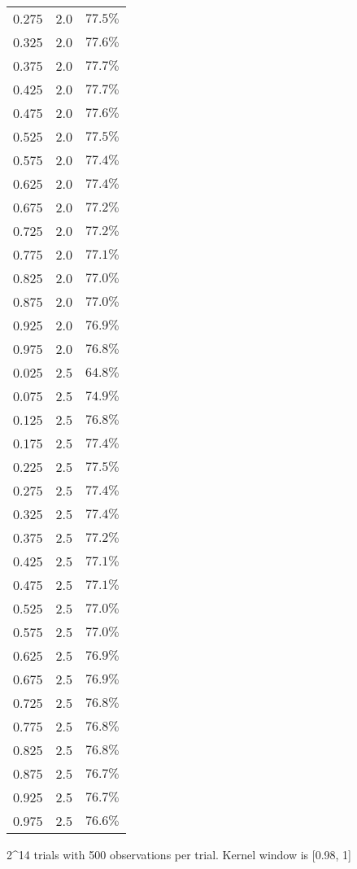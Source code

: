 \begin{longtable}{rrr}
0.275 & 2.0 & $77.5\%$ \\ 
0.325 & 2.0 & $77.6\%$ \\ 
0.375 & 2.0 & $77.7\%$ \\ 
0.425 & 2.0 & $77.7\%$ \\ 
0.475 & 2.0 & $77.6\%$ \\ 
0.525 & 2.0 & $77.5\%$ \\ 
0.575 & 2.0 & $77.4\%$ \\ 
0.625 & 2.0 & $77.4\%$ \\ 
0.675 & 2.0 & $77.2\%$ \\ 
0.725 & 2.0 & $77.2\%$ \\ 
0.775 & 2.0 & $77.1\%$ \\ 
0.825 & 2.0 & $77.0\%$ \\ 
0.875 & 2.0 & $77.0\%$ \\ 
0.925 & 2.0 & $76.9\%$ \\ 
0.975 & 2.0 & $76.8\%$ \\ 
0.025 & 2.5 & $64.8\%$ \\ 
0.075 & 2.5 & $74.9\%$ \\ 
0.125 & 2.5 & $76.8\%$ \\ 
0.175 & 2.5 & $77.4\%$ \\ 
0.225 & 2.5 & $77.5\%$ \\ 
0.275 & 2.5 & $77.4\%$ \\ 
0.325 & 2.5 & $77.4\%$ \\ 
0.375 & 2.5 & $77.2\%$ \\ 
0.425 & 2.5 & $77.1\%$ \\ 
0.475 & 2.5 & $77.1\%$ \\ 
0.525 & 2.5 & $77.0\%$ \\ 
0.575 & 2.5 & $77.0\%$ \\ 
0.625 & 2.5 & $76.9\%$ \\ 
0.675 & 2.5 & $76.9\%$ \\ 
0.725 & 2.5 & $76.8\%$ \\ 
0.775 & 2.5 & $76.8\%$ \\ 
0.825 & 2.5 & $76.8\%$ \\ 
0.875 & 2.5 & $76.7\%$ \\ 
0.925 & 2.5 & $76.7\%$ \\ 
0.975 & 2.5 & $76.6\%$ \\ 
\bottomrule
\end{longtable}
\begin{minipage}{\linewidth}
2\textasciicircum{}14 trials with 500 observations per trial. Kernel window is [0.98, 1]\\
\end{minipage}

